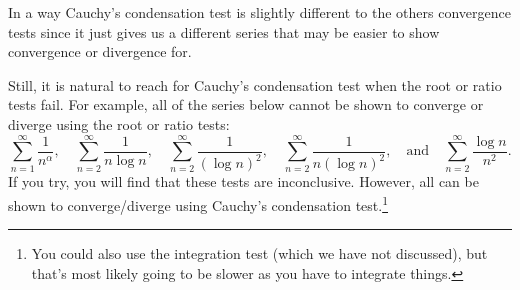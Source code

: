 In a way Cauchy's condensation test is slightly different to the others convergence tests since it just gives us a different series that may be easier to show convergence or divergence for.

Still, it is natural to reach for Cauchy's condensation test when the root or ratio tests fail. For example, all of the series below cannot be shown to converge or diverge using the root or ratio tests:
$$
\sum_{n=1}^{\infty} \frac{1}{n^{\alpha}}, \quad \sum_{n=2}^{\infty} \frac{1}{n \log n}, \quad \sum_{n=2}^{\infty} \frac{1}{(\log n)^{2}}, \quad \sum_{n=2}^{\infty} \frac{1}{n(\log n)^{2}}, \quad \text{and} \quad \sum_{n=2}^{\infty} \frac{\log n}{n^{2}}.
$$
If you try, you will find that these tests are inconclusive. However, all can be shown to converge/diverge using Cauchy's condensation test.\footnote{You could also use the integration test (which we have not discussed), but that's most likely going to be slower as you have to integrate things.}





	

